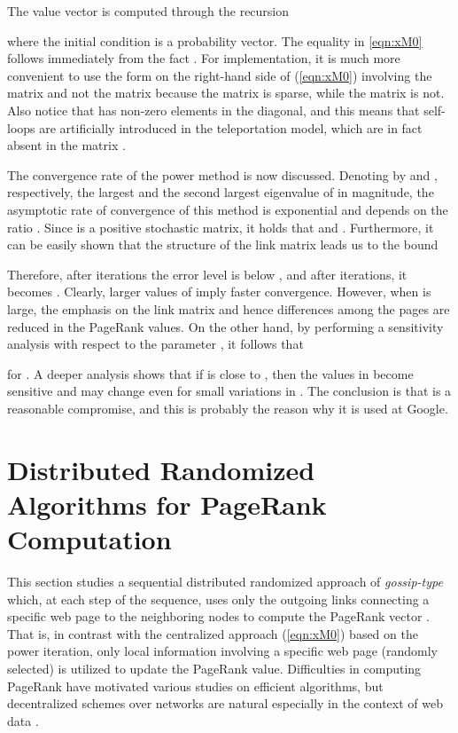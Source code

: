 \documentclass[11pt,draftcls,onecolumn]{IEEEtran}
\begin{document}
The value vector  is computed through the recursion 

where the initial condition  is a probability vector.  
The equality in \eqref{eqn:xM0} follows immediately from the fact 
.
For implementation, it is much more convenient to use the form 
on the right-hand side of 
(\ref{eqn:xM0}) involving the matrix  and not the matrix  because the matrix 
 is sparse, while the matrix  is not. Also notice that  has non-zero elements 
in the diagonal, and this means that self-loops are artificially introduced in 
the teleportation model, which are in fact absent in the matrix .

The convergence rate of the power method is now discussed.
Denoting by  and , respectively,  
the largest and the second largest eigenvalue of  
in magnitude, the asymptotic rate of convergence of this method is exponential and
depends on the ratio .
Since  is a positive stochastic matrix, 
it holds that  and .
Furthermore, it can be easily shown that 
the structure of the link matrix  leads us to the bound 

Therefore, after  iterations the error level is below 
, and 
after  iterations, it becomes .
Clearly, larger values of  imply faster convergence. 
However, when  is large, the emphasis on the link matrix  
and hence differences among the pages are reduced in the PageRank values. 
On the other hand, 
by performing a sensitivity analysis with respect to the parameter , 
it follows that

for . A deeper analysis \cite{LanMey:06} shows that if  
is close to , then 
the values in  become sensitive and may change even for small 
variations in .
The conclusion is that  is a reasonable compromise, 
and this is probably the reason why it is used at Google.

\section*{Distributed Randomized Algorithms for PageRank Computation}

This section studies a sequential distributed randomized approach of {\it gossip-type} which, 
at each step of the sequence, uses only the outgoing links connecting a specific web page to 
the neighboring nodes to compute the PageRank vector  \cite{IshTem:10}. That is, in contrast with  
the centralized approach (\ref{eqn:xM0}) based on the power iteration, only local information 
involving a specific web page (randomly selected) is utilized to update the PageRank value. 
Difficulties in computing PageRank have motivated various studies on efficient algorithms,
but decentralized schemes over networks \cite{BerTsi:89} 
are natural especially in the context of web data \cite{ZhaChFa:13,Nesterov:12,Necoara:13}. 
\end{document}
